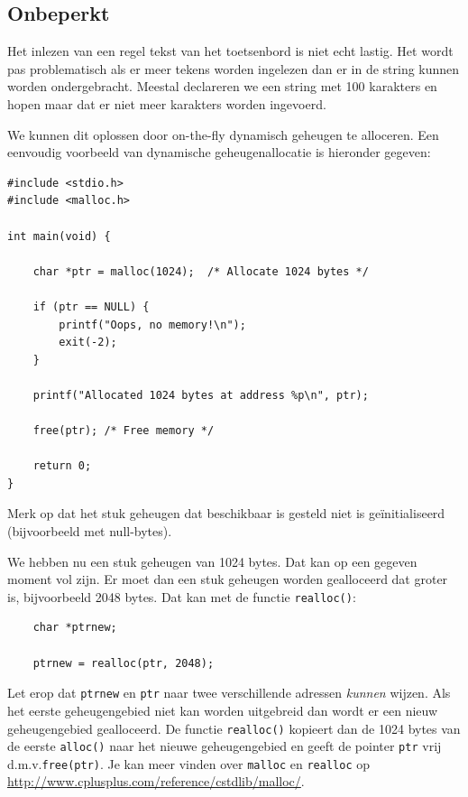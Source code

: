 \documentclass[a4paper,10pt,fleqn,twoside]{article}
\begin{document}
\subsection{Onbeperkt}
Het inlezen van een regel tekst van het toetsenbord is niet echt lastig. Het wordt pas problematisch als er meer tekens worden ingelezen dan er in de string kunnen worden ondergebracht. Meestal declareren we een string met 100 karakters en hopen maar dat er niet meer karakters worden ingevoerd.

We kunnen dit oplossen door on-the-fly dynamisch geheugen te alloceren. Een eenvoudig voorbeeld van dynamische geheugenallocatie is hieronder gegeven:

\begin{lstlisting}
#include <stdio.h>
#include <malloc.h>

int main(void) {

	char *ptr = malloc(1024);  /* Allocate 1024 bytes */

	if (ptr == NULL) {
		printf("Oops, no memory!\n");
		exit(-2);
	}

	printf("Allocated 1024 bytes at address %p\n", ptr);

	free(ptr); /* Free memory */

	return 0;
}
\end{lstlisting}

Merk op dat het stuk geheugen dat beschikbaar is gesteld niet is geïnitialiseerd (bijvoorbeeld met null-bytes).

We hebben nu een stuk geheugen van 1024 bytes. Dat kan op een gegeven moment vol zijn. Er moet dan een stuk geheugen worden gealloceerd dat groter is, bijvoorbeeld 2048 bytes. Dat kan met de functie \lstinline|realloc()|:

\begin{lstlisting}
	char *ptrnew;

	ptrnew = realloc(ptr, 2048);
\end{lstlisting}

Let erop dat \lstinline|ptrnew| en \lstinline|ptr| naar twee verschillende adressen \textsl{kunnen} wijzen. Als het eerste geheugengebied niet kan worden uitgebreid dan wordt er een nieuw geheugengebied gealloceerd. De functie \lstinline|realloc()| kopieert dan de 1024 bytes van de eerste \lstinline|alloc()| naar het nieuwe geheugengebied en geeft de pointer \lstinline|ptr| vrij d.m.v.\@ \lstinline|free(ptr)|. Je kan meer vinden over \lstinline|malloc| en \lstinline|realloc| op 
\url{http://www.cplusplus.com/reference/cstdlib/malloc/}.
\end{document}
